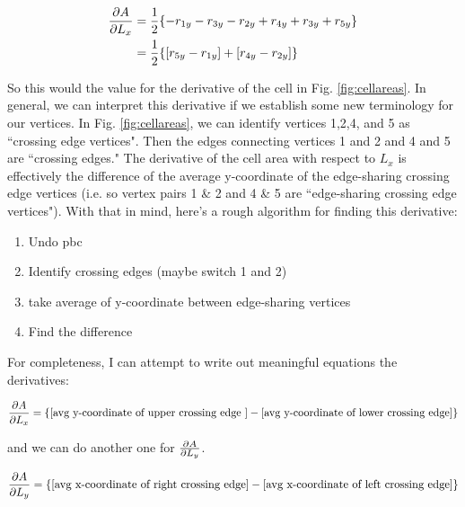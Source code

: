 \documentclass[12pt]{article}
\begin{document}
\begin{center}
\begin{equation}
\begin{split}
\pdv{A}{L_x} &= \frac{1}{2} \{-r_{1y} - r_{3y} - r_{2y} + r_{4y} + r_{3y} + r_{5y} \}\\
 &= \frac{1}{2} \{[r_{5y} - r_{1y}] + [r_{4y} - r_{2y}] \}
\end{split}
\end{equation}
\end{center}
So this would the value for the derivative of the cell in Fig. \ref{fig:cellareas}. In general, we can interpret this derivative if we establish some new terminology for our vertices. In Fig. \ref{fig:cellareas}, we can identify vertices 1,2,4, and 5 as ``crossing edge vertices". Then the edges connecting vertices 1 and 2 and 4 and 5 are ``crossing edges." The derivative of the cell area with respect to $L_x$ is effectively the difference of the average y-coordinate of the edge-sharing crossing edge vertices (i.e. so vertex pairs 1 \& 2 and 4 \& 5 are ``edge-sharing crossing edge vertices"). With that in mind, here's a rough algorithm for finding this derivative:
\begin{enumerate}
\item Undo pbc
\item Identify crossing edges (maybe switch 1 and 2)
\item take average of y-coordinate between edge-sharing vertices
\item Find the difference
\end{enumerate}
For completeness, I can attempt to write out  meaningful equations the derivatives:
\begin{center}
\begin{equation}
\label{dadlx}
\pdv{A}{L_x} = \{ [\text{avg y-coordinate of upper crossing edge }] - [\text{avg y-coordinate of lower crossing edge}]\}
\end{equation}
\end{center}
and we can do another one for $\pdv{A}{L_y}$.
\begin{center}
\begin{equation}
\label{dadly}
\pdv{A}{L_y} = \{[\text{avg x-coordinate of right crossing edge}] - [\text{avg x-coordinate of left crossing edge}]\}
\end{equation}
\end{center}
\end{document}
